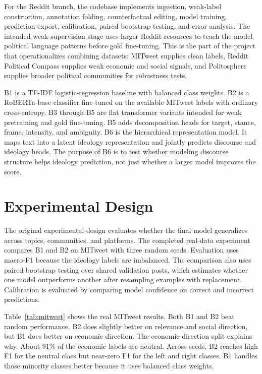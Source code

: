 \documentclass[11pt,twocolumn]{article}
\begin{document}
For the Reddit branch, the codebase implements ingestion, weak-label construction, annotation folding, counterfactual editing, model training, prediction export, calibration, paired bootstrap testing, and error analysis. The intended weak-supervision stage uses larger Reddit resources to teach the model political language patterns before gold fine-tuning. This is the part of the project that operationalizes combining datasets: MITweet supplies clean labels, Reddit Political Compass supplies weak economic and social signals, and Politosphere supplies broader political communities for robustness tests.

B1 is a TF-IDF logistic-regression baseline with balanced class weights. B2 is a RoBERTa-base classifier fine-tuned on the available MITweet labels with ordinary cross-entropy. B3 through B5 are flat transformer variants intended for weak pretraining and gold fine-tuning. B5 adds decomposition heads for target, stance, frame, intensity, and ambiguity. B6 is the hierarchical representation model. It maps text into a latent ideology representation and jointly predicts discourse and ideology heads. The purpose of B6 is to test whether modeling discourse structure helps ideology prediction, not just whether a larger model improves the score.

\section{Experimental Design}

The original experimental design evaluates whether the final model generalizes across topics, communities, and platforms. The completed real-data experiment compares B1 and B2 on MITweet with three random seeds. Evaluation uses macro-F1 because the ideology labels are imbalanced. The comparison also uses paired bootstrap testing over shared validation posts, which estimates whether one model outperforms another after resampling examples with replacement. Calibration is evaluated by comparing model confidence on correct and incorrect predictions.

Table~\ref{tab:mitweet} shows the real MITweet results. Both B1 and B2 beat random performance. B2 does slightly better on relevance and social direction, but B1 does better on economic direction. The economic-direction split explains why. About 91\% of the economic labels are neutral. Across seeds, B2 reaches high F1 for the neutral class but near-zero F1 for the left and right classes. B1 handles those minority classes better because it uses balanced class weights.
\end{document}
